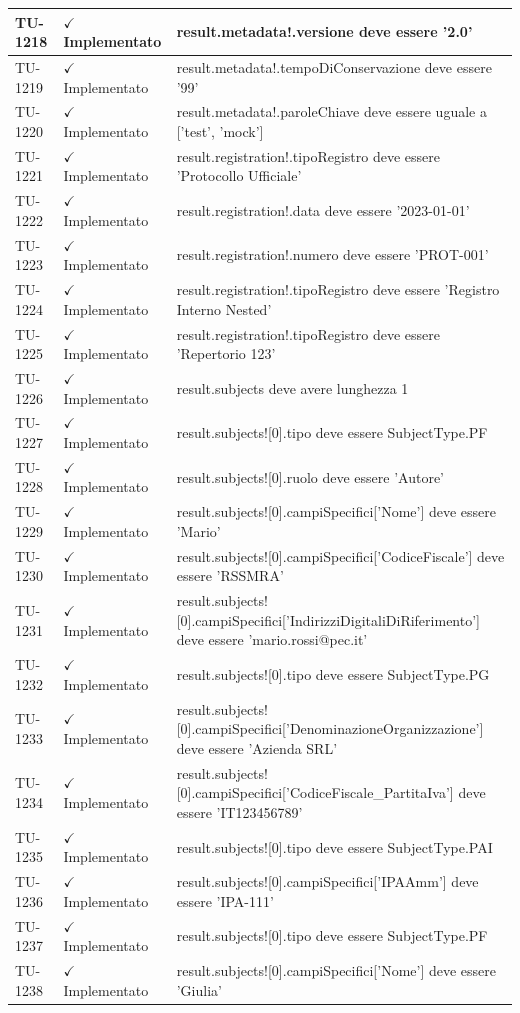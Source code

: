 ﻿\documentclass[a4paper,12pt]{article}
\newcommand{\ok}{\textcolor{green!60!black}{$\checkmark$ Implementato}}
\begin{document}
\begin{longtable}{|p{2cm}|p{3.5cm}|p{9.5cm}|}
\hline
TU-1218 & \ok & result.metadata!.versione deve essere '2.0' \\
\hline
TU-1219 & \ok & result.metadata!.tempoDiConservazione deve essere '99' \\
\hline
TU-1220 & \ok & result.metadata!.paroleChiave deve essere uguale a ['test', 'mock'] \\
\hline
TU-1221 & \ok & result.registration!.tipoRegistro deve essere 'Protocollo Ufficiale' \\
\hline
TU-1222 & \ok & result.registration!.data deve essere '2023-01-01' \\
\hline
TU-1223 & \ok & result.registration!.numero deve essere 'PROT-001' \\
\hline
TU-1224 & \ok & result.registration!.tipoRegistro deve essere 'Registro Interno Nested' \\
\hline
TU-1225 & \ok & result.registration!.tipoRegistro deve essere 'Repertorio 123' \\
\hline
TU-1226 & \ok & result.subjects deve avere lunghezza 1 \\
\hline
TU-1227 & \ok & result.subjects![0].tipo deve essere SubjectType.PF \\
\hline
TU-1228 & \ok & result.subjects![0].ruolo deve essere 'Autore' \\
\hline
TU-1229 & \ok & result.subjects![0].campiSpecifici['Nome'] deve essere 'Mario' \\
\hline
TU-1230 & \ok & result.subjects![0].campiSpecifici['CodiceFiscale'] deve essere 'RSSMRA' \\
\hline
TU-1231 & \ok & result.subjects![0].campiSpecifici['IndirizziDigitaliDiRiferimento'] deve essere 'mario.rossi@pec.it' \\
\hline
TU-1232 & \ok & result.subjects![0].tipo deve essere SubjectType.PG \\
\hline
TU-1233 & \ok & result.subjects![0].campiSpecifici['DenominazioneOrganizzazione'] deve essere 'Azienda SRL' \\
\hline
TU-1234 & \ok & result.subjects![0].campiSpecifici['CodiceFiscale\_PartitaIva'] deve essere 'IT123456789' \\
\hline
TU-1235 & \ok & result.subjects![0].tipo deve essere SubjectType.PAI \\
\hline
TU-1236 & \ok & result.subjects![0].campiSpecifici['IPAAmm'] deve essere 'IPA-111' \\
\hline
TU-1237 & \ok & result.subjects![0].tipo deve essere SubjectType.PF \\
\hline
TU-1238 & \ok & result.subjects![0].campiSpecifici['Nome'] deve essere 'Giulia' \\

\end{longtable}
\end{document}

